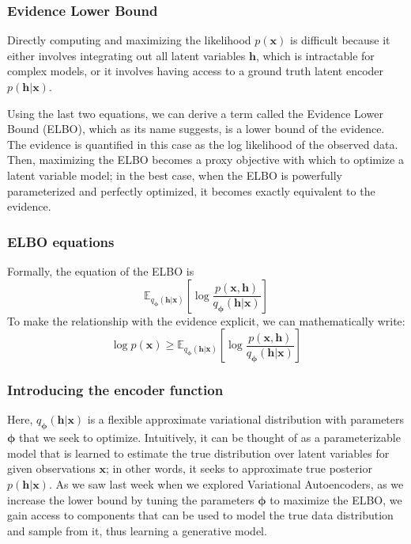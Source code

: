 \documentclass{beamer}
\begin{document}
\begin{frame}
\frametitle{Evidence Lower Bound}

Directly computing and maximizing the likelihood $p(\bm{x})$ is
difficult because it either involves integrating out all latent
variables $\bm{h}$, which is intractable for
complex models, or it involves having access to a ground truth latent
encoder $p(\bm{h}|\bm{x})$.

Using the last  two equations, we can derive a term called the Evidence Lower Bound (ELBO), which as its name suggests, is a lower
  bound of the evidence.  The evidence is quantified in this case as
the log likelihood of the observed data.  Then, maximizing the ELBO
becomes a proxy objective with which to optimize a latent variable
model; in the best case, when the ELBO is powerfully parameterized and
perfectly optimized, it becomes exactly equivalent to the evidence.
\end{frame}

\begin{frame}
\frametitle{ELBO equations}

Formally, the equation of the ELBO is
\begin{equation*}
\mathbb{E}_{q_{\bm{\phi}}(\bm{h}|\bm{x})}\left[\log\frac{p(\bm{x}, \bm{h})}{q_{\bm{\phi}}(\bm{h}|\bm{x})}\right]
\end{equation*}
To make the relationship with the evidence explicit, we can mathematically write:
\begin{equation*}
\log p(\bm{x}) \geq \mathbb{E}_{q_{\bm{\phi}}(\bm{h}|\bm{x})}\left[\log\frac{p(\bm{x}, \bm{h})}{q_{\bm{\phi}}(\bm{h}|\bm{x})}\right]
\end{equation*}
\end{frame}

\begin{frame}
\frametitle{Introducing the encoder function}

Here, $q_{\bm{\phi}}(\bm{h}|\bm{x})$ is a flexible approximate
variational distribution with parameters $\bm{\phi}$ that we seek to
optimize.  Intuitively, it can be thought of as a parameterizable
model that is learned to estimate the true distribution over latent
variables for given observations $\bm{x}$; in other words, it seeks to
approximate true posterior $p(\bm{h}|\bm{x})$.  As we saw last week when we
explored Variational Autoencoders, as we increase the lower bound
by tuning the parameters $\bm{\phi}$ to maximize the ELBO, we gain
access to components that can be used to model the true data
distribution and sample from it, thus learning a generative model.
\end{frame}
\end{document}
